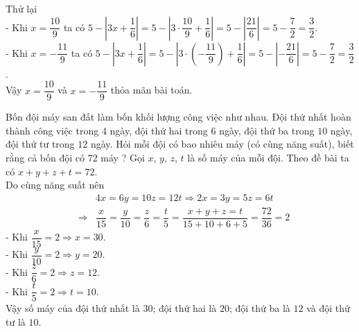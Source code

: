 \begin{ex}
{\begin{enumerate}
					 Thử lại\\
					 - Khi $x = \dfrac{10}{9}$ ta có $5 - \left\vert 3x+\dfrac{1}{6}\right\vert = 5 - \left\vert 3\cdot \dfrac{10}{9}+\dfrac{1}{6}\right\vert = 5 - \left\vert \dfrac{21}{6}\right\vert = 5 -\dfrac{7}{2} = \dfrac{3}{2}$.\\
					 - Khi $x = - \dfrac{11}{9}$ ta có $5 - \left\vert 3x+\dfrac{1}{6}\right\vert = 5 - \left\vert 3\cdot \left(- \dfrac{11}{9}\right)+\dfrac{1}{6}\right\vert = 5 - \left\vert - \dfrac{21}{6}\right\vert = 5 - \dfrac{7}{2} = \dfrac{3}{2}$.\\
					 Vậy $x = \dfrac{10}{9}$ và $x = - \dfrac{11}{9}$ thỏa mãn bài toán.
				\end{enumerate}
			}
		\end{ex}
	
		\begin{ex}%
		Bốn đội máy san đất làm bốn khối lượng công việc như nhau. Đội thứ nhất hoàn thành công việc trong $4$ ngày, đội thứ hai trong $6$ ngày, đội thứ ba trong $10$ ngày, đội thứ tư trong $12$ ngày. Hỏi mỗi đội có bao nhiêu máy (có cùng năng suất), biết rằng cả bốn đội có $72$ máy ?
		\loigiai
		{Gọi $x$, $y$, $z$, $t$  là số máy của mỗi đội. Theo đề bài ta có $x + y + z + t = 72$.\\
		Do cùng năng suất nên 
		\begin{eqnarray*}
		&{ }& 4x = 6y = 10z  = 12t \Rightarrow 2x = 3y = 5z  = 6t\\
		&\Rightarrow& 
		\dfrac{x}{15} = \dfrac{y}{10} = \dfrac{z}{6} =\dfrac{t}{5} = \dfrac{x + y + z = t}{15 + 10 + 6 + 5} = \dfrac{72}{36} = 2
		\end{eqnarray*}
		- Khi $\dfrac{x}{15} = 2\Rightarrow x = 30$.\\
		- Khi $\dfrac{y}{10} = 2\Rightarrow y = 20$.\\
		- Khi $\dfrac{z}{6} = 2\Rightarrow z = 12$.\\
		- Khi $\dfrac{t}{5} = 2\Rightarrow t = 10$.\\
		Vậy số máy của đội thứ nhất là $30$; đội thứ hai là $20$; đội thứ ba là $12$ và đội thứ tư là $10$.
		}
	\end{ex}
	

